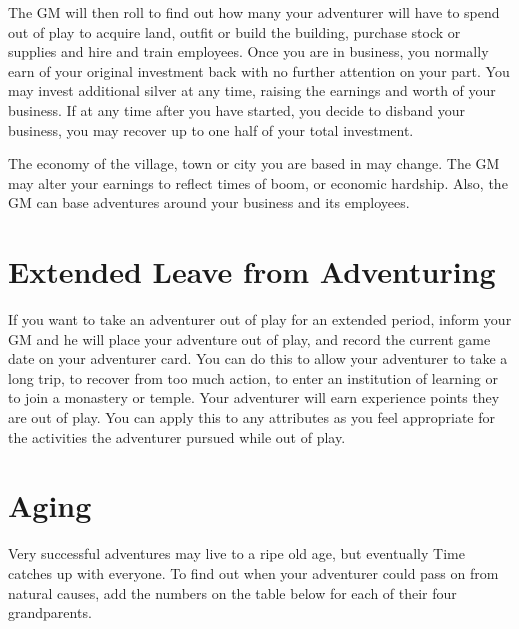 \begin{multicols*}{2}
The GM will then roll  to find out how many  your adventurer will have to spend out of play to acquire land, outfit or build the building, purchase stock or supplies and hire and train employees. Once you are in business, you normally earn  of your original investment back  with no further attention on your part. You may invest additional silver at any time, raising the earnings and worth of your business. If at any time after you have started, you decide to disband your business, you may recover up to one half of your total investment.

The economy of the village, town or city you are based in may change. The GM may alter your earnings to reflect times of boom, or economic hardship. Also, the GM can base adventures around your business and its employees.
\section{Extended Leave from Adventuring}
If you want to take an adventurer out of play for an extended period, inform your GM and he will place your adventure out of play, and record the current game date on your adventurer card. You can do this to allow your adventurer to take a long trip, to recover from too much action, to enter an institution of learning or to join a monastery or temple. Your adventurer will earn  experience points  they are out of play. You can apply this to any attributes as you feel appropriate for the activities the adventurer pursued while out of play. 

\indx{Day\xspace of Awakening}
\section{Aging}
Very successful adventures may live to a ripe old age, but eventually Time catches up with everyone. To find out when your adventurer could pass on from natural causes, add the numbers on the table below for each of their four grandparents.


\end{multicols*}
